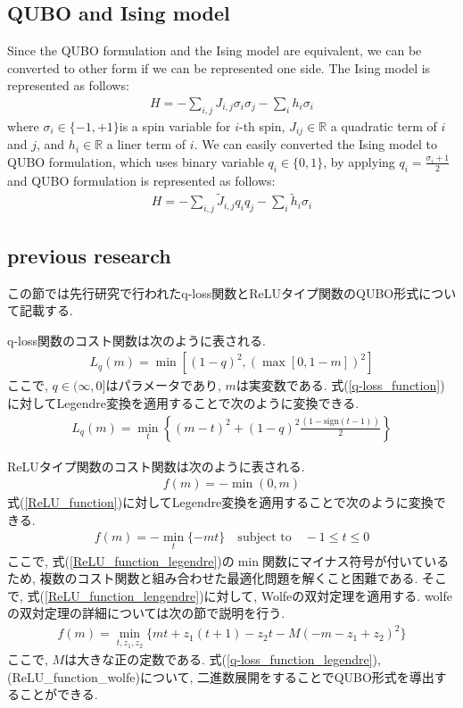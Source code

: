 \documentclass[fp,twocolumn]{jpsj3}
\begin{document}
\subsection{QUBO and Ising model} %
Since the QUBO formulation and the Ising model are equivalent, we can be converted to other form if we can be represented one side. The Ising model is represented as follows:
\begin{eqnarray}
  H=-\sum_{i,j}{J_{i,j}\sigma_{i}\sigma_{j}}-\sum_{i}{h_{i}\sigma_{i}}
\end{eqnarray}
where $\sigma_{i}\in \{-1,+1\}$is a spin variable for $i$-th spin, $J_{ij}\in \mathbb{R}$ a quadratic term of $i$ and $j$, and $h_{i}\in \mathbb{R}$ a liner term of $i$. We can easily converted the Ising model to QUBO formulation, which uses binary variable $q_{i}\in \{0,1\}$, by applying $q_{i}=\frac{\sigma_{i}+1}{2}$ and QUBO formulation is represented as follows:
\begin{eqnarray}
  H=-\sum_{i,j}{\tilde{J}_{i,j}q_{i}q_{j}}-\sum_{i}{\tilde{h}_{i}\sigma_{i}}
\end{eqnarray}

\subsection{previous research}
この節では先行研究で行われたq-loss関数とReLUタイプ関数のQUBO形式について記載する.

q-loss関数のコスト関数は次のように表される.
\begin{eqnarray}
  L_{q}(m)=\min{[(1-q)^{2}, (\max{[0,1-m]})^{2}]} \label{q-loss_function}
\end{eqnarray}
ここで, $q\in (\infty,0]$はパラメータであり, $m$は実変数である. 式(\ref{q-loss_function})に対してLegendre変換を適用することで次のように変換できる.
\begin{eqnarray}
  L_{q}(m)=\min_{t}{\left\{(m-t)^{2}+(1-q)^{2}\frac{(1-\text{sign}(t-1))}{2}\right\}} \label{q-loss_function_legendre}
\end{eqnarray}

ReLUタイプ関数のコスト関数は次のように表される.
\begin{eqnarray}
  f(m)=-\min{(0,m)} \label{ReLU_function}
\end{eqnarray}
式(\ref{ReLU_function})に対してLegendre変換を適用することで次のように変換できる.
\begin{eqnarray}
  f(m)=-\min_{t}{\{-mt\}} \quad \text{subject to} \quad -1\leq t\leq 0 \label{ReLU_function_legendre}
\end{eqnarray}
ここで, 式(\ref{ReLU_function_legendre})の$\min$関数にマイナス符号が付いているため, 複数のコスト関数と組み合わせた最適化問題を解くこと困難である. そこで, 式(\ref{ReLU_function_lengendre})に対して, Wolfeの双対定理を適用する. wolfeの双対定理の詳細については次の節で説明を行う.
\begin{eqnarray}
  f(m)=\min_{t,z_{1},z_{2}}{\{mt+z_{1}(t+1)-z_{2}t-M(-m-z_{1}+z_{2})^{2}\}} \label{ReLU_function_wolfe}
\end{eqnarray}
ここで, $M$は大きな正の定数である.
式(\ref{q-loss_function_legendre}),(ReLU_function_wolfe)について, 二進数展開をすることでQUBO形式を導出することができる.
\end{document}
